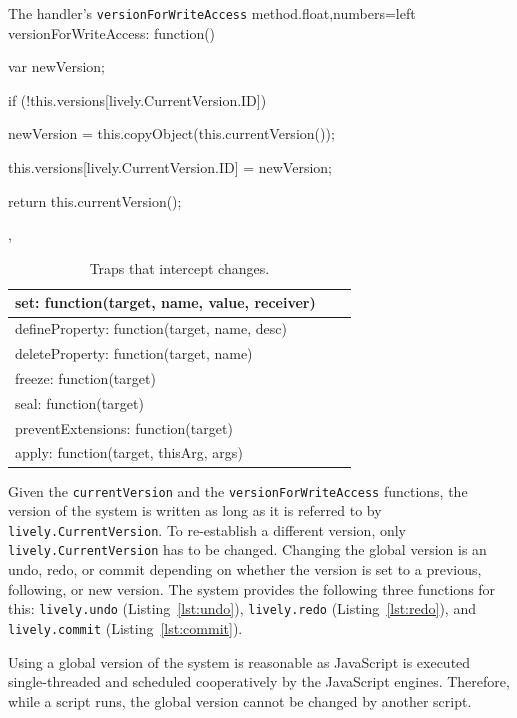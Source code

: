\begin{code}{The handler's \lstinline{versionForWriteAccess} method.}{float,numbers=left}
versionForWriteAccess: function() {
    var newVersion;
    
    if (!this.versions[lively.CurrentVersion.ID]) {
        newVersion = this.copyObject(this.currentVersion());
        
        this.versions[lively.CurrentVersion.ID] = newVersion;
    }
    
    return this.currentVersion();
},
\end{code}
\iffalse
\end{verbatim}\fi

\begin{table}[h]
\begin{center}
\begin{tabular}{|l|l|r|}
\hline
set: function(target, name, value, receiver) \\ \hline
defineProperty: function(target, name, desc) \\ \hline
deleteProperty: function(target, name) \\ \hline
freeze: function(target) \\ \hline
seal: function(target) \\ \hline
preventExtensions: function(target) \\ \hline
apply: function(target, thisArg, args) \\ \hline
\end{tabular}
\caption[Table caption text]{Traps that intercept changes.}
\label{table:writeTraps}
\end{center}
\end{table}

Given the \lstinline{currentVersion} and the \lstinline{versionForWriteAccess} functions, the version of the system is written as long as it is referred to by \lstinline{lively.CurrentVersion}.
To re-establish a different version, only \lstinline{lively.CurrentVersion} has to be changed.
Changing the global version is an undo, redo, or commit depending on whether the version is set to a previous, following, or new version.
The system provides the following three functions for this: \lstinline{lively.undo} (Listing~\ref{lst:undo}), \lstinline{lively.redo} (Listing~\ref{lst:redo}), and \lstinline{lively.commit} (Listing~\ref{lst:commit}).

Using a global version of the system is reasonable as JavaScript is executed single-threaded and scheduled cooperatively by the JavaScript engines.
Therefore, while a script runs, the global version cannot be changed by another script.

